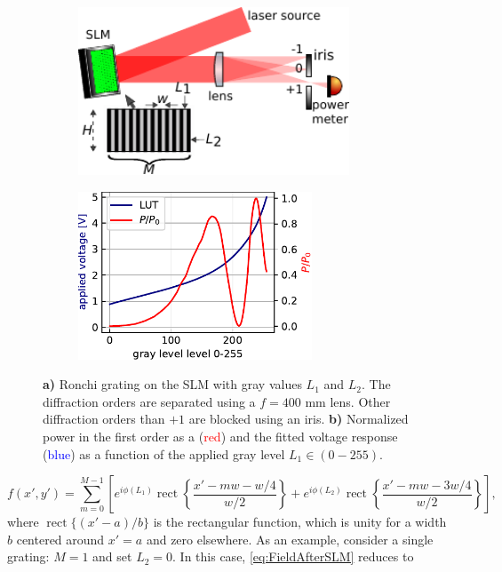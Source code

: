 \begin{figure}
	\begin{subfigure}{.51\linewidth}
		\flushleft
		\includegraphics[height=5cm]{figures/LUTcalibrationSetup.pdf}
		\caption{}
		\label{fig:LUTCalibrationSetup}
	\end{subfigure}
	\hfill
	\begin{subfigure}{.48\linewidth}
		\flushright
		\includegraphics[height=5cm]{figures/LUTplot.pdf}
		\caption{}
		\label{fig:LUTcalibration}
	\end{subfigure}
	\caption{\textsf{\textbf{a)}} Ronchi grating on the SLM with gray values $L_1$ and $L_2$. 
	The diffraction orders are separated using a $f=400$ mm lens. 
	Other diffraction orders than $+1$ are blocked using an iris. 
	\textsf{\textbf{b)}} Normalized power in the first order as a (\textcolor{red}{red}) and the fitted voltage response (\textcolor{blue}{blue}) as a function of the applied gray level $L_1 \in (0-255)$.}
\end{figure}

\begin{equation}\label{eq:FieldAfterSLM}
    f(x',y') = \sum_{m=0}^{M-1} \left[
    e^{i \phi(L_1)} \operatorname{rect}\left\{\frac{x'-m w - w/4}{w/2}\right\} + 
    e^{i \phi(L_2)}\operatorname{rect}\left\{\frac{x'- m w - 3 w/4}{w/2}\right\}
    \right],
\end{equation}
where $\operatorname{rect}\{(x'-a)/b\}$ is the rectangular function, which is unity for a width $b$ centered around $x'=a$ and zero elsewhere.
As an example, consider a single grating: $M=1$ and set $L_2=0$.
In this case, \cref{eq:FieldAfterSLM} reduces to 

